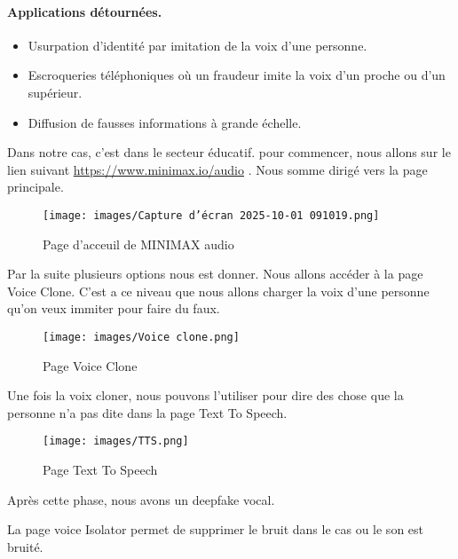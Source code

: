 \documentclass[memoire, 12pt]{report}
\begin{document}
\paragraph{Applications détournées.}
\begin{itemize}
    \item Usurpation d’identité par imitation de la voix d’une personne.
    \item Escroqueries téléphoniques où un fraudeur imite la voix d’un proche ou d’un supérieur.
    \item Diffusion de fausses informations à grande échelle.
\end{itemize}

Dans notre cas, c'est dans le secteur éducatif. pour commencer, nous allons sur le lien suivant \url{https://www.minimax.io/audio} . Nous somme dirigé vers la page principale.

\begin{center}
\begin{figure}[h] 
    \centering
    \texttt{[image: images/Capture d’écran 2025-10-01 091019.png]} 
    \caption{Page d'acceuil de MINIMAX audio}
    \label{fig:principal}
\end{figure}
\end{center}

 Par la suite plusieurs options nous est donner. Nous allons accéder à la page  Voice Clone. C'est a ce niveau que nous allons charger la voix d'une personne qu'on veux immiter pour faire du faux. 
 
\begin{center}
\begin{figure}[h] 
    \centering
    \texttt{[image: images/Voice clone.png]} 
    \caption{Page Voice Clone}
    \label{fig:vc}
\end{figure}
\end{center}
 
 Une fois la voix cloner, nous pouvons l'utiliser pour dire des chose que la personne n'a pas dite dans la page Text To Speech.
 
\begin{center}
\begin{figure}[h] 
    \centering
    \texttt{[image: images/TTS.png]} 
    \caption{Page Text To Speech}
    \label{fig:tts}
\end{figure}
\end{center}
Après cette phase, nous avons un deepfake vocal.

La page voice Isolator permet de supprimer le bruit dans le cas ou le son est bruité.
\end{document}
